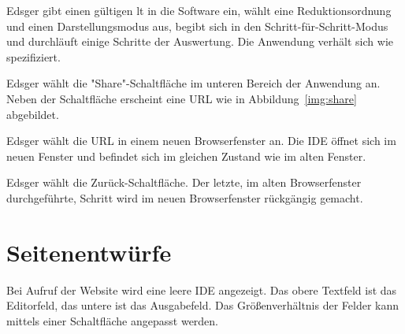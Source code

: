 \documentclass[parskip=full,11pt,twoside]{scrartcl}
\begin{document}

{Edsger gibt einen gültigen \gls{lt} in die Software ein, wählt eine Reduktionsordnung und einen
Darstellungsmodus aus, begibt sich in den Schritt-für-Schritt-Modus und durchläuft einige
Schritte der Auswertung.}
{Die Anwendung verhält sich wie spezifiziert.}

{Edsger wählt die "Share"-Schaltfläche im unteren Bereich der Anwendung an.}
{Neben der Schaltfläche erscheint eine URL wie in Abbildung~\ref{img:share}
abgebildet.}

{Edsger wählt die URL in einem neuen Browserfenster an.}
{Die IDE öffnet sich im neuen Fenster und befindet sich im gleichen Zustand wie im
alten Fenster.}

{Edsger wählt die Zurück-Schaltfläche.}
{Der letzte, im alten Browserfenster durchgeführte, Schritt wird im neuen Browserfenster
rückgängig gemacht.}

%
%
%

\pagebreak
\appendix

\section{Seitenentwürfe}


Bei Aufruf der Website wird eine leere IDE angezeigt. Das obere Textfeld ist das Editorfeld, das untere ist das Ausgabefeld. Das Größenverhältnis der Felder kann mittels einer Schaltfläche angepasst werden.
\end{document}
